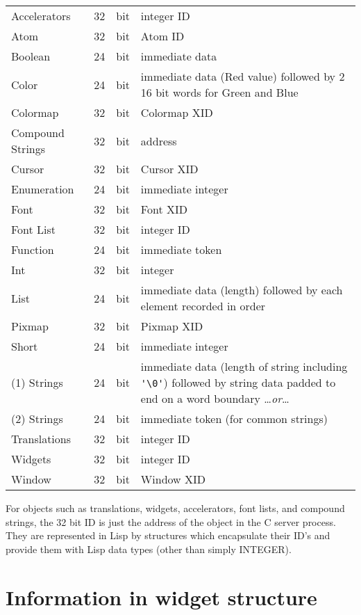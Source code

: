 \documentclass{article}
\begin{document}
\begin{center}
\begin{tabular}{|l|rl|p{}|}
\hline
Accelerators	& 32 & bit & integer ID\\
Atom		& 32 & bit & Atom ID\\
Boolean		& 24 & bit & immediate data\\
Color		& 24 & bit & immediate data (Red value) followed by
			     2 16 bit words for Green and Blue\\
Colormap	& 32 & bit & Colormap XID\\
Compound Strings	& 32 & bit & address\\
Cursor		& 32 & bit & Cursor XID\\
Enumeration	& 24 & bit & immediate integer\\
Font		& 32 & bit & Font XID\\
Font List	& 32 & bit & integer ID\\
Function	& 24 & bit & immediate token\\
Int		& 32 & bit & integer\\
List		& 24 & bit & immediate data (length) followed by each element
			     recorded in order\\
Pixmap		& 32 & bit & Pixmap XID\\
Short		& 24 & bit & immediate integer\\
(1) Strings	& 24 & bit & immediate data (length of string
                             including \verb+'\0'+)
			     followed by string data padded to end on
			     a word boundary \ldots\emph{or}\ldots\\
(2) Strings	& 24 & bit & immediate token (for common strings)\\
Translations	& 32 & bit & integer ID\\
Widgets		& 32 & bit & integer ID\\
Window		& 32 & bit & Window XID\\\hline
\end{tabular}
\end{center}

\vspace{2mm}

For objects such as translations, widgets, accelerators, font lists,
and compound strings, the 32 bit ID is just the address of the object in
the C server process.  They are represented in Lisp by structures which
encapsulate their ID's and provide them with Lisp data types (other than
simply INTEGER).

\section{Information in widget structure}
\end{document}
